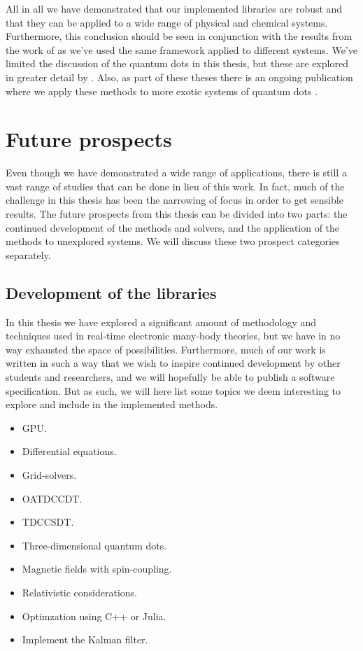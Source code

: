     All in all we have demonstrated that our implemented libraries are robust
    and that they can be applied to a wide range of physical and chemical
    systems.
    Furthermore, this conclusion should be seen in conjunction with the results
    from the work of \citeauthor{greg-winther} \cite{greg-winther} as we've used
    the same framework applied to different systems.
    We've limited the discussion of the quantum dots in this thesis, but these
    are explored in greater detail by \citeauthor{greg-winther}.
    Also, as part of these theses there is an ongoing publication where we apply
    these methods to more exotic systems of quantum dots \cite{td-quantum-dots}.


    \section{Future prospects}
        \label{sec:future-work}
        Even though we have demonstrated a wide range of applications, there is
        still a vast range of studies that can be done in lieu of this work.
        In fact, much of the challenge in this thesis has been the narrowing of
        focus in order to get sensible results.
        The future prospects from this thesis can be divided into two parts: the
        continued development of the methods and solvers, and the application of
        the methods to unexplored systems.
        We will discuss these two prospect categories separately.

        \subsection{Development of the libraries}
            In this thesis we have explored a significant amount of methodology
            and techniques used in real-time electronic many-body theories, but
            we have in no way exhausted the space of possibilities.
            Furthermore, much of our work is written in such a way that we wish
            to inspire continued development by other students and researchers,
            and we will hopefully be able to publish a software specification.
            But as such, we will here list some topics we deem interesting to
            explore and include in the implemented methods.
            \begin{itemize}
                \item GPU.
                \item Differential equations.
                \item Grid-solvers.
                \item OATDCCDT.
                \item TDCCSDT.
                \item Three-dimensional quantum dots.
                \item Magnetic fields with spin-coupling.
                \item Relativistic considerations.
                \item Optimzation using C++ or Julia.
                \item Implement the Kalman filter.
            \end{itemize}

